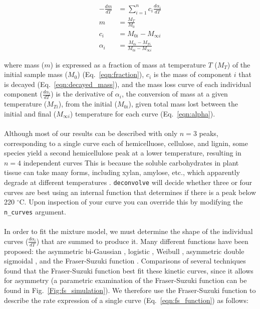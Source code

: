 \documentclass{jors}\usepackage[]{graphicx}\usepackage[]{color}
\begin{document}
\begin{align}
	-\frac{dm}{dT} &= \sum\limits_{i=1}^n c_i\frac{d\alpha_{i}}{dT} \label{eqn:mixture_model} \\
	m &= \frac{M_T}{M_0} \label{eqn:fraction} \\
	c_i &= M_{0i} - M_{\infty i} \label{eqn:decayed_mass} \\
	\alpha_i &= \frac{M_{0i} - M_{Ti}}{M_{0i} - M_{\infty i}} \label{eqn:alpha}
\end{align}

where mass ($m$) is expressed as a fraction of mass at temperature $T$ ($M_T$) of the initial sample mass ($M_0$) (Eq.~\ref{eqn:fraction}), $c_i$ is the mass of component $i$ that is decayed (Eq.~\ref{eqn:decayed_mass}), and the mass loss curve of each individual component ($\frac{d\alpha_{i}}{dT}$) is the derivative of $\alpha_i$, the conversion of mass at a given temperature ($M_{Ti}$), from the initial ($M_{0i}$), given total mass lost between the initial and final ($M_{\infty i}$) temperature for each curve  (Eq.~\ref{eqn:alpha}).\\
\\
Although most of our results can be described with only $n = 3$ peaks, corresponding to a single curve each of hemicelluose, cellulose, and lignin, some species yield a second hemicellulose peak at a lower temperature, resulting in $n = 4$ independent curves This is because the soluble carbohydrates in plant tissue can take many forms, including xylan, amylose, etc., which apparently degrade at different temperatures \citep[see also][]{chen2017,muller-hagedorn2007}. \verb|deconvolve| will decide whether three or four curves are best using an internal function that determines if there is a peak below 220 $^{\circ}$C. Upon inspection of your curve you can override this by modifying the \verb|n_curves| argument.\\
\\
In order to fit the mixture model, we must determine the shape of the individual curves ($\frac{d\alpha_{i}}{dT}$) that are summed to produce it. Many different functions have been proposed: the asymmetric bi-Gaussian \citep{sun2015}, logistic \citep{barbadillo2007}, Weibull \citep{cai2007}, asymmetric double sigmoidal \citep{chen2017}, and the Fraser-Suzuki function \citep{perejon2011,hu2016}. Comparisons of several techniques \citep{svoboda2013,perejon2011,cheng2015} found that the Fraser-Suzuki function best fit these kinetic curves, since it allows for asymmetry (a parametric examination of the Fraser-Suzuki function can be found in Fig.~\ref{Fig:fs_simulation}). We therefore use the Fraser-Suzuki function to describe the rate expression of a single curve (Eq.~\ref{eqn:fs_function}) as follows:
\end{document}
